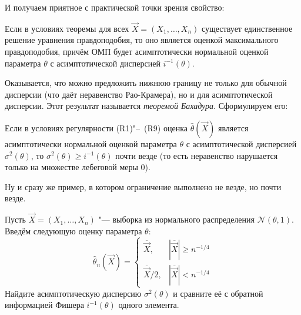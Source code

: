 И получаем приятное с практической точки зрения свойство:
\begin{consequence}
    Если в условиях теоремы для всех $\vec{X} = (X_{1}, \ldots, X_{n})$ существует единственное решение уравнения правдоподобия, то оно является оценкой максимального правдоподобия, причём ОМП будет асимптотически нормальной оценкой параметра $\theta$ с асимптотической дисперсией $i^{-1}(\theta)$.
\end{consequence}

Оказывается, что можно предложить нижнюю границу не только для обычной дисперсии (что даёт неравенство Рао-Крамера), но и для асимптотической дисперсии. Этот результат называется \emph{теоремой Бахадура}. Сформулируем его:
\begin{theorem}[Бахадур]
    Если в условиях регулярности (R1)"--~(R9) оценка $\hat{\theta}(\vec{X})$ является асимптотически нормальной оценкой параметра $\theta$ с асимптотической дисперсией $\sigma^{2}(\theta)$, то $\sigma^{2}(\theta) \geq i^{-1}(\theta)$ почти везде (то есть неравенство нарушается только на множестве лебеговой меры 0).
\end{theorem}
Ну и сразу же пример, в котором ограничение выполнено не везде, но почти везде.
\begin{problem}
    Пусть $\vec{X} = (X_{1}, \ldots, X_{n})$ "--- выборка из нормального распределения $\mathcal{N}(\theta, 1)$. Введём следующую оценку параметра $\theta$:
    \[
        \hat{\theta}_{n}(\vec{X})
        = \begin{cases}
            \overline{\vec{X}}, & |\overline{\vec{X}}| \geq n^{-1/4} \\
            \overline{\vec{X}}/2, & |\overline{\vec{X}}| < n^{-1/4}
        \end{cases}
    \]
    Найдите асимптотическую дисперсию $\sigma^{2}(\theta)$ и сравните её с обратной информацией Фишера $i^{-1}(\theta)$ одного элемента. 
\end{problem}
